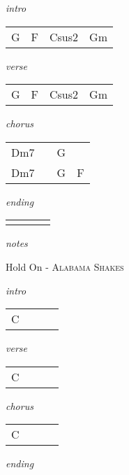 \documentclass[12pt]{article}
\begin{document}
\huge
\textit{intro}

\begin{tabular}{|P{1.25in}|P{1.25in}|P{1.25in}|P{1.25in}|}
  G & F & Csus2  &  Gm \\
\end{tabular}

\textit{verse}

\begin{tabular}{|P{1.25in}|P{1.25in}|P{1.25in}|P{1.25in}|}
  G & F  &  Csus2 &  Gm \\
\end{tabular}

\textit{chorus}

\begin{tabular}{|P{1.25in}|P{1.25in}|P{1.25in}|P{1.25in}|}
  Dm7 &   & G  &   \\
  Dm7 &   & G  &  F \\

\end{tabular}

\textit{ending}

\begin{tabular}{|P{1.25in}|P{1.25in}|P{1.25in}|P{1.25in}|}
   &   &   &   \\
\end{tabular}

\textit{notes}

\newpage


{\Huge Hold On} {\huge - \textsc{Alabama Shakes}}

\huge
\textit{intro}

\begin{tabular}{|P{1.25in}|P{1.25in}|P{1.25in}|P{1.25in}|}
  C &   &   &   \\
\end{tabular}

\textit{verse}

\begin{tabular}{|P{1.25in}|P{1.25in}|P{1.25in}|P{1.25in}|}
  C &   &   &   \\
\end{tabular}

\textit{chorus}

\begin{tabular}{|P{1.25in}|P{1.25in}|P{1.25in}|P{1.25in}|}
  C &   &   &   \\
\end{tabular}

\textit{ending}
\end{document}

